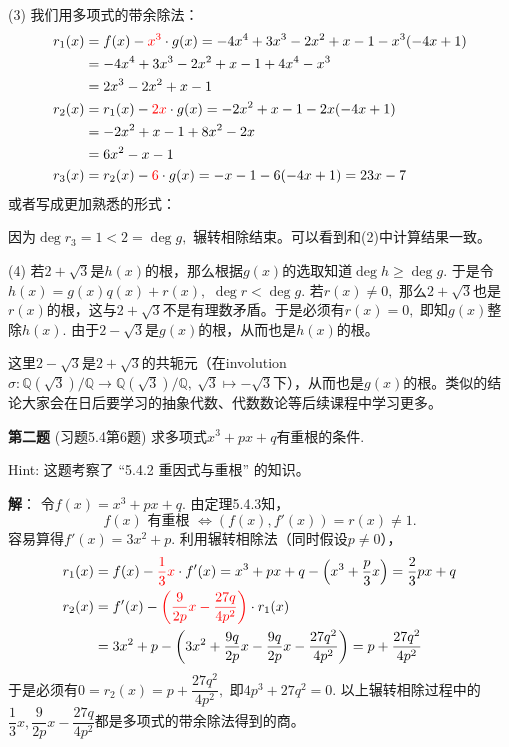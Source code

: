 \vspace{0.5em}

(3) 我们用多项式的带余除法：
\begin{align*}
r_1(x) & = f(x) - {\color{red} x^3} \cdot g(x) = - 4x^4 + 3x^3 - 2x^2 + x - 1 - x^3 (- 4x + 1) \\
& = - 4x^4 + 3x^3 - 2x^2 + x - 1 + 4x^4 - x^3 \\
& = 2x^3 - 2x^2 + x - 1 \\
r_2(x) & = r_1(x) - {\color{red} 2x} \cdot g(x) = - 2x^2 + x - 1 - 2x (- 4x + 1) \\
& = - 2x^2 + x - 1 + 8x^2 - 2x \\
& = 6x^2 - x - 1 \\
r_3(x) & = r_2(x) - {\color{red} 6} \cdot g(x) = - x - 1 - 6 (- 4x + 1) = 23 x - 7
\end{align*}
或者写成更加熟悉的形式：
\begin{center}
\end{center}
因为$\deg r_3 = 1 < 2 = \deg g,$ 辗转相除结束。可以看到和(2)中计算结果一致。

\vspace{0.5em}

(4) 若$2 + \sqrt{3}$是$h(x)$的根，那么根据$g(x)$的选取知道$\deg h \geqslant \deg g.$ 于是令$h(x) = g(x) q(x) + r(x),$ $\deg r < \deg g.$ 若$r(x) \neq 0,$ 那么$2 + \sqrt{3}$也是$r(x)$的根，这与$2 + \sqrt{3}$不是有理数矛盾。于是必须有$r(x) = 0,$ 即知$g(x)$整除$h(x).$ 由于$2 - \sqrt{3}$是$g(x)$的根，从而也是$h(x)$的根。

这里$2 - \sqrt{3}$是$2 + \sqrt{3}$的共轭元（在involution $\sigma: \mathbb{Q}(\sqrt{3}) / \mathbb{Q} \to \mathbb{Q}(\sqrt{3}) / \mathbb{Q}, ~ \sqrt{3} \mapsto -\sqrt{3}$下），从而也是$g(x)$的根。类似的结论大家会在日后要学习的抽象代数、代数数论等后续课程中学习更多。

\fi  %

\newpageorvspace

{\bf 第二题} (习题5.4第6题) 求多项式$x^3 + px + q$有重根的条件.

Hint: 这题考察了 ``5.4.2 重因式与重根'' 的知识。

\ifIncludeAnswer

\newpageorvspace

{\bf 解}： 令$f(x) = x^3 + px + q.$ 由定理5.4.3知，
$$f(x) \text{ 有重根 } \Longleftrightarrow \left( f(x), f'(x) \right) = r(x) \neq 1.$$
容易算得$f'(x) = 3x^2 + p.$ 利用辗转相除法（同时假设$p\neq 0$），
\begin{align*}
r_1(x) & = f(x) - {\color{red} \dfrac{1}{3}x} \cdot f'(x) = x^3 + px + q - \left( x^3 + \dfrac{p}{3}x \right) = \dfrac{2}{3}px + q \\
r_2(x) & = f'(x) - {\color{red} \left( \dfrac{9}{2p}x - \dfrac{27q}{4p^2} \right)} \cdot r_1(x) \\
& = 3x^2 + p - \left( 3x^2 + \dfrac{9q}{2p}x - \dfrac{9q}{2p}x - \dfrac{27q^2}{4p^2} \right) = p + \dfrac{27q^2}{4p^2}
\end{align*}
于是必须有$0 = r_2(x) = p + \dfrac{27q^2}{4p^2},$ 即$4p^3 + 27q^2 = 0.$ 以上辗转相除过程中的$\dfrac{1}{3}x, \dfrac{9}{2p}x - \dfrac{27q}{4p^2}$都是多项式的带余除法得到的商。


